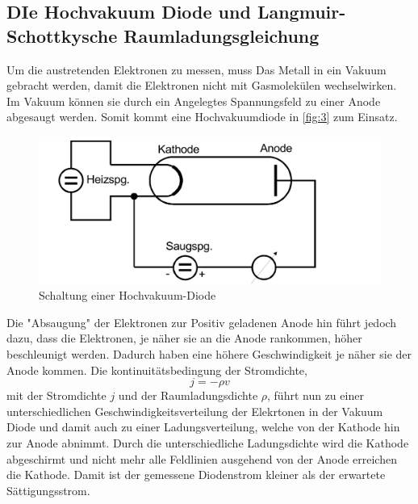 \subsection{DIe Hochvakuum Diode und Langmuir-Schottkysche Raumladungsgleichung}
Um die austretenden Elektronen zu messen, muss Das Metall in ein Vakuum gebracht werden, damit die Elektronen nicht mit Gasmolekülen wechselwirken. 
Im Vakuum können sie durch ein Angelegtes Spannungsfeld zu einer Anode abgesaugt werden. Somit kommt eine Hochvakuumdiode in \autoref{fig:3}
zum Einsatz.
\begin{figure}[H]
    \centering
        \centering
        \includegraphics[width=\textwidth]{Bilder/schaltung.jpg}
        \caption{Schaltung einer Hochvakuum-Diode}
    \hfill
    \label{fig:3}
\end{figure}
Die "Absaugung" der Elektronen zur Positiv geladenen Anode hin führt jedoch dazu, dass die Elektronen, je näher sie an 
die Anode rankommen, höher beschleunigt werden. Dadurch haben eine höhere Geschwindigkeit je näher sie der Anode kommen. 
Die kontinuitätsbedingung der Stromdichte, 
\begin{equation}
j = -\rho v
\end{equation}
mit der Stromdichte $j$ und der Raumladungsdichte $\rho$, führt nun zu einer unterschiedlichen Geschwindigkeitsverteilung der Elekrtonen in der Vakuum Diode 
und damit auch zu einer Ladungsverteilung, welche von der Kathode hin zur Anode abnimmt. Durch die unterschiedliche Ladungsdichte wird die Kathode abgeschirmt und nicht mehr alle Feldlinien
 ausgehend von der Anode erreichen die Kathode. Damit ist der gemessene Diodenstrom kleiner als der erwartete Sättigungsstrom.
